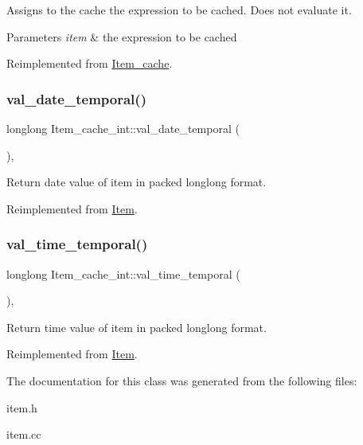 Assigns to the cache the expression to be cached. Does not evaluate it. 
\begin{DoxyParams}{Parameters}
{\em item} & the expression to be cached \\
\hline
\end{DoxyParams}


Reimplemented from \mbox{\hyperlink{classItem__cache_a89d0134e0a71238cb6fa7a32a23f88e7}{Item\+\_\+cache}}.

\mbox{\label{classItem__cache__int_afea06afa547e7884db25240f67cfff0d}} 
\subsubsection{\texorpdfstring{val\+\_\+date\+\_\+temporal()}{val\_date\_temporal()}}
{\footnotesize\ttfamily longlong Item\+\_\+cache\+\_\+int\+::val\+\_\+date\+\_\+temporal (\begin{DoxyParamCaption}{ }\end{DoxyParamCaption})\hspace{0.3cm}{\ttfamily [inline]}, {\ttfamily [virtual]}}

Return date value of item in packed longlong format. 

Reimplemented from \mbox{\hyperlink{classItem_a9174217a46706eb2db74689b5365c4a5}{Item}}.

\mbox{\label{classItem__cache__int_af7bbf9ca88eac67901bc1e7c5768392a}} 
\subsubsection{\texorpdfstring{val\+\_\+time\+\_\+temporal()}{val\_time\_temporal()}}
{\footnotesize\ttfamily longlong Item\+\_\+cache\+\_\+int\+::val\+\_\+time\+\_\+temporal (\begin{DoxyParamCaption}{ }\end{DoxyParamCaption})\hspace{0.3cm}{\ttfamily [inline]}, {\ttfamily [virtual]}}

Return time value of item in packed longlong format. 

Reimplemented from \mbox{\hyperlink{classItem_a69ef60a3917a1bb4832498a695754c58}{Item}}.



The documentation for this class was generated from the following files\+:\begin{DoxyCompactItemize}
\item 
item.\+h\item 
item.\+cc\end{DoxyCompactItemize}
